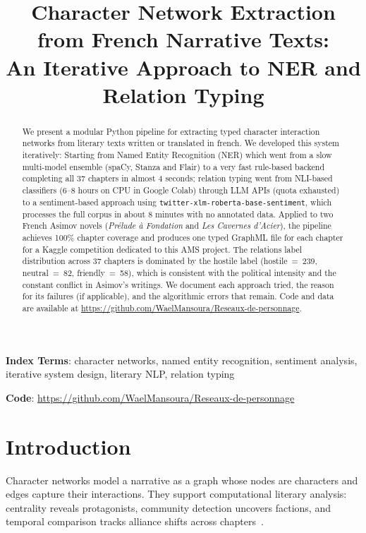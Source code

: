 \documentclass[a4paper]{article}
\title{Character Network Extraction from French Narrative Texts:\\
An Iterative Approach to NER and Relation Typing}
\begin{document}
\maketitle

\begin{abstract}
We present a modular Python pipeline for extracting typed character interaction
networks from literary texts written or translated in french. We developed this system iteratively:
Starting from Named Entity Recognition (NER) which went from a slow multi-model ensemble (spaCy, Stanza and Flair) to a very fast rule-based backend completing all 37 chapters in almost 4
seconds; relation typing went from NLI-based classifiers (6--8 hours on CPU in Google Colab)
through LLM APIs (quota exhausted) to a sentiment-based approach using
\texttt{twitter-xlm-roberta-base-sentiment}, which processes the
full corpus in about 8 minutes with no annotated data.
Applied to two French Asimov novels (\textit{Prélude à Fondation} and
\textit{Les Cavernes d'Acier}), the pipeline achieves 100\% chapter coverage
and produces one typed GraphML file for each chapter for a Kaggle competition dedicated to this AMS project.
The relations label distribution across 37 chapters is dominated by the hostile label
(hostile~=~239, neutral~=~82, friendly~=~58), which is consistent with the political
intensity and the constant conflict in Asimov's writings.
We document each approach tried, the reason for its failures (if applicable), and the algorithmic
errors that remain.
Code and data are available at \url{https://github.com/WaelMansoura/Reseaux-de-personnage}.
\end{abstract}

\noindent\textbf{Index Terms}: character networks, named entity recognition,
sentiment analysis, iterative system design, literary NLP, relation typing

\noindent\textbf{Code}: \url{https://github.com/WaelMansoura/Reseaux-de-personnage}

\section{Introduction}

Character networks model a narrative as a graph whose nodes are characters
and edges capture their interactions. They support computational literary
analysis: centrality reveals protagonists, community detection uncovers
factions, and temporal comparison tracks alliance shifts across
chapters~\cite{Moretti2005,Bonato2016}.
\end{document}
